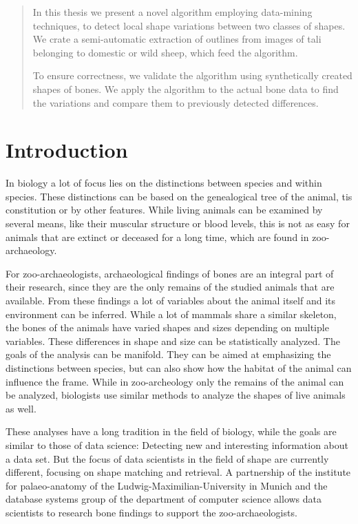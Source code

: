 \documentclass[pdftex,12pt,a4paper]{report}
\begin{document}
\deckblatt

\erklaerung

\begin{abstract}
In this thesis we present a novel algorithm employing data-mining techniques, to detect local shape variations between two classes of shapes. We crate a semi-automatic extraction of outlines from images of tali belonging to domestic or wild sheep, which feed the algorithm.

To ensure correctness, we validate the algorithm using synthetically created shapes of bones. We apply the algorithm to the actual bone data to find the variations and compare them to previously detected differences.
\end{abstract}

\tableofcontents

\chapter{Introduction}

In biology a lot of focus lies on the distinctions between species and within species. These distinctions can be based on the genealogical tree of the animal, tis constitution or by other features. While living animals can be examined by several means, like their muscular structure or blood levels, this is not as easy for animals that are extinct or deceased for a long time, which are found in zoo-archaeology.

For zoo-archaeologists, archaeological findings of bones are an integral part of their research, since they are the only remains of the studied animals that are available. From these findings a lot of variables about the animal itself and its environment can be inferred. While a lot of mammals share a similar skeleton, the bones of the animals have varied shapes and sizes depending on multiple variables. These differences in shape and size can be statistically analyzed. The goals of the analysis can be manifold. They can be aimed at emphasizing the distinctions between species, but can also show how the habitat of the animal can influence the frame. While in zoo-archeology only the remains of the animal can be analyzed, biologists use similar methods to analyze the shapes of live animals as well.

These analyses have a long tradition in the field of biology, while the goals are similar to those of data science: Detecting new and interesting information about a data set. But the focus of data scientists in the field of shape are currently different, focusing on shape matching and retrieval. A partnership of the institute for palaeo-anatomy of the Ludwig-Maximilian-University in Munich and the database systems group of the department of computer science allows data scientists to research bone findings to support the zoo-archaeologists.
\end{document}

